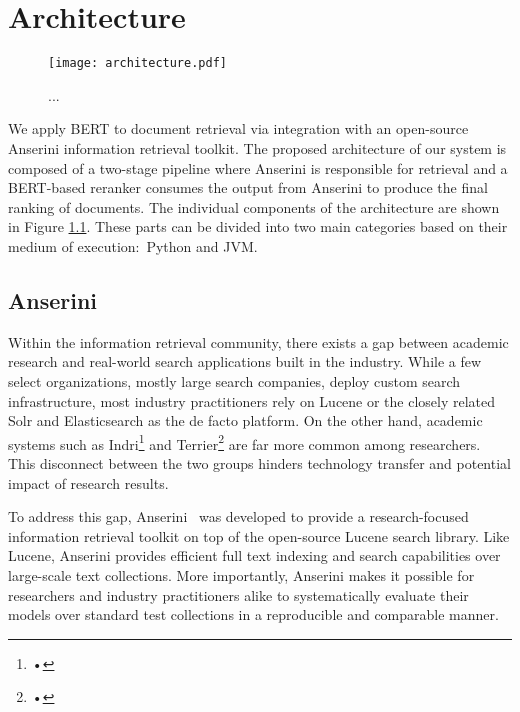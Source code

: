 \chapter{Architecture}
\label{ch:arch}

\begin{figure}[b!]
\centering
  \texttt{[image: architecture.pdf]}
\caption{...}
\label{fig:arch}
\end{figure}

We apply BERT to document retrieval via integration with an open-source Anserini information retrieval toolkit.
The proposed architecture of our system is composed of a two-stage pipeline where Anserini is responsible for retrieval and a BERT-based reranker consumes the output from Anserini to produce the final ranking of documents.
The individual components of the architecture are shown in Figure \ref{fig:arch}.
These parts can be divided into two main categories based on their medium of execution:\ Python and JVM.

\section{Anserini}

Within the information retrieval community, there exists a gap between academic research and real-world search applications built in the industry.
While a few select organizations, mostly large search companies, deploy custom search infrastructure, most industry practitioners rely on Lucene or the closely related Solr and Elasticsearch as the de facto platform.
On the other hand, academic systems such as Indri\footnote{•} and Terrier\footnote{•} are far more common among researchers.
This disconnect between the two groups hinders technology transfer and potential impact of research results.

To address this gap, Anserini~\cite{} was developed to provide a research-focused information retrieval toolkit on top of the open-source Lucene search library.
Like Lucene, Anserini provides efficient full text indexing and search capabilities over large-scale text collections.
More importantly, Anserini makes it possible for researchers and industry practitioners alike to systematically evaluate their models over standard test collections in a reproducible and comparable manner.


